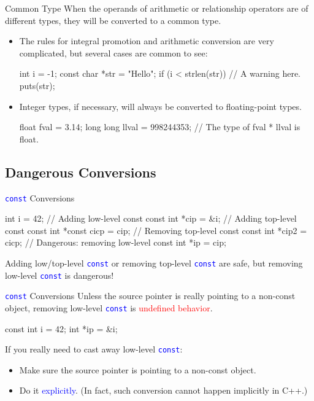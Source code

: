 \documentclass{beamer}
\newcommand{\red}[1]{\textcolor{red}{#1}}
\newcommand{\blue}[1]{\textcolor{blue}{#1}}
\newcommand{\ttt}[1]{\texttt{#1}}
\newcommand{\bluett}[1]{\blue{\ttt{#1}}}
\theoremstyle{definition}
\begin{document}
\begin{frame}[fragile]{Common Type}
    When the operands of arithmetic or relationship operators are of different types, they will be converted to a common type.
    \pause
    \begin{itemize}
        \item The rules for integral promotion and arithmetic conversion are very complicated, but several cases are common to see:
        \begin{cpp}
int i = -1;
const char *str = "Hello";
if (i < strlen(str)) // A warning here.
  puts(str);
        \end{cpp}
        \pause
        \item Integer types, if necessary, will always be converted to floating-point types.
        \begin{cpp}
float fval = 3.14;
long long llval = 998244353;
// The type of fval * llval is float.
        \end{cpp}
    \end{itemize}
\end{frame}

\subsection{Dangerous Conversions}

\begin{frame}[fragile]{\bluett{const} Conversions}
    \begin{cpp}
int i = 42;
// Adding low-level const
const int *cip = &i;
// Adding top-level const
const int *const cicp = cip;
// Removing top-level const
const int *cip2 = cicp;
// Dangerous: removing low-level const
int *ip = cip;
    \end{cpp}
    \pause
    Adding low/top-level \bluett{const} or removing top-level \bluett{const} are safe, but removing low-level \bluett{const} is dangerous!
\end{frame}

\begin{frame}[fragile]{\bluett{const} Conversions}
    Unless the source pointer is really pointing to a non-const object, removing low-level \bluett{const} is \red{undefined behavior}.
    \begin{cpp}
const int i = 42;
int *ip = &i;
    \end{cpp}
    \pause
    If you really need to cast away low-level \bluett{const}:
    \begin{itemize}
        \item Make sure the source pointer is pointing to a non-const object.
        \item Do it \blue{explicitly}. (In fact, such conversion cannot happen implicitly in C++.)
    \end{itemize}
\end{frame}
\end{document}
